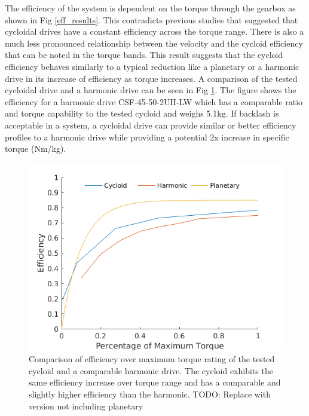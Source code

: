 
The efficiency of the system is dependent on the torque through the gearbox as shown in Fig \ref{eff_results}.
This contradicts previous studies that suggested that cycloidal drives have a constant efficiency across the torque range.
There is also a much less pronounced relationship between the velocity and the cycloid efficiency that can be noted in the torque bands.
This result suggests that the cycloid efficiency behaves similarly to a typical reduction like a planetary or a harmonic drive in its increase of efficiency as torque increases. 
A comparison of the tested cycloidal drive and a harmonic drive can be seen in Fig \ref{eff_comp}.
The figure shows the efficiency for a harmonic drive CSF-45-50-2UH-LW \cite{harmonic_sheet} which has a comparable ratio and torque capability to the tested cycloid and weighs 5.1kg.
If backlash is acceptable in a system, a cycloidal drive can provide similar or better efficiency profiles to a harmonic drive while providing a potential 2x increase in specific torque (Nm/kg).

\begin{figure}[t]
   \centering
   \includegraphics[width=\linewidth]{images/eff_comp_v3}
   \caption{Comparison of efficiency over maximum torque rating of the tested cycloid and a comparable harmonic drive.
   The cycloid exhibits the same efficiency increase over torque range and has a comparable and slightly higher efficiency than the harmonic. TODO: Replace with version not including planetary}
   \label{eff_comp}
\end{figure}

